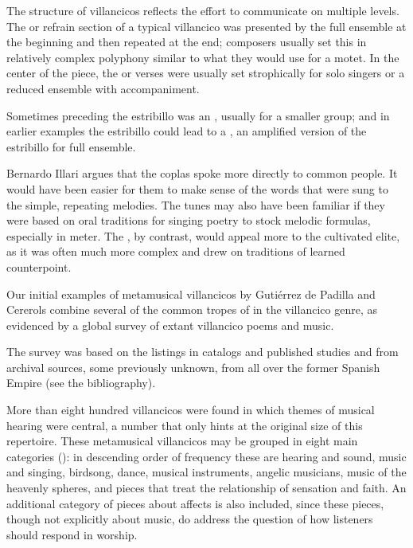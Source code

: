 The structure of villancicos reflects the effort to communicate on multiple
levels.
The  or refrain section of a typical villancico was presented
by the full ensemble at the beginning and then repeated at the end; composers
usually set this in relatively complex polyphony similar to what they would use
for a motet.
In the center of the piece, the  or verses were usually set
strophically for solo singers or a reduced ensemble with accompaniment.%
\begin{Footnote}
    Sometimes preceding the estribillo was an , usually for
    a smaller group; and in earlier examples the estribillo could lead to a
    , an amplified version of the estribillo for full
    ensemble.
\end{Footnote}
Bernardo Illari argues that the coplas spoke more directly to common people.%
    \Autocite{Illari:Popular}
It would have been easier for them to make sense of the words that were sung to
the simple, repeating melodies.
The tunes may also have been familiar if they were based on oral traditions for
singing poetry to stock melodic formulas, especially in  meter.
The , by contrast, would appeal more to the cultivated elite,
as it was often much more complex and drew on traditions of learned
counterpoint.


Our initial examples of metamusical villancicos by Gutiérrez de Padilla and
Cererols combine several of the common tropes of  in
the villancico genre, as evidenced by a global survey of extant villancico
poems and music.%
\begin{Footnote}
    The survey was based on the listings in catalogs and published studies and
    from archival sources, some previously unknown, from all over the former
    Spanish Empire (see the bibliography).
\end{Footnote}
More than eight hundred villancicos were found in which themes of musical
hearing were central, a number that only hints at the original size of this
repertoire.
These metamusical villancicos may be grouped in eight main categories
(): in descending order of frequency these are hearing and
sound, music and singing, birdsong, dance, musical instruments, angelic
musicians, music of the heavenly spheres, and pieces that treat the
relationship of sensation and faith.
An additional category of pieces about affects is also included, since these
pieces, though not explicitly about music, do address the question of how
listeners should respond in worship. 

